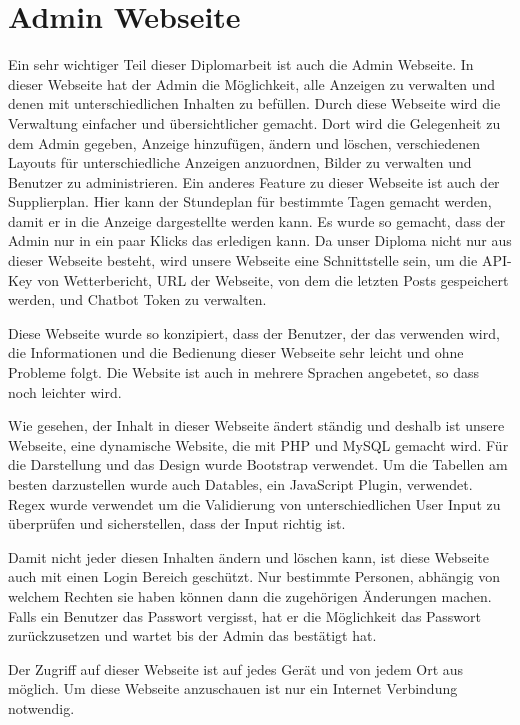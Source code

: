 \section{Admin Webseite}
Ein sehr wichtiger Teil dieser Diplomarbeit ist auch die Admin Webseite. In dieser Webseite hat der Admin die M\"{o}glichkeit, alle Anzeigen zu verwalten und denen mit unterschiedlichen Inhalten zu bef\"{u}llen. Durch diese Webseite wird die Verwaltung einfacher und \"{u}bersichtlicher gemacht. Dort wird die Gelegenheit zu dem Admin gegeben, Anzeige hinzuf\"{u}gen, \"{a}ndern und l\"{o}schen, verschiedenen Layouts f\"{u}r unterschiedliche Anzeigen anzuordnen, Bilder zu verwalten und Benutzer zu administrieren. Ein anderes Feature zu dieser Webseite ist auch der Supplierplan. Hier kann der Stundeplan f\"{u}r bestimmte Tagen gemacht werden, damit er in die Anzeige dargestellte werden kann. Es wurde so gemacht, dass der Admin nur in ein paar Klicks das erledigen kann. Da unser Diploma nicht nur aus dieser Webseite besteht, wird unsere Webseite eine Schnittstelle sein, um die API-Key von Wetterbericht, URL der Webseite, von dem die letzten Posts gespeichert werden, und Chatbot Token zu verwalten.

Diese Webseite wurde so konzipiert, dass der Benutzer, der das verwenden wird, die Informationen und die Bedienung dieser Webseite sehr leicht und ohne Probleme folgt. Die Website ist auch in mehrere Sprachen angebetet, so dass noch leichter wird.

Wie gesehen, der Inhalt in dieser Webseite \"{a}ndert st\"{a}ndig und deshalb ist unsere Webseite, eine dynamische Website, die mit PHP und MySQL gemacht wird. F\"{u}r die Darstellung und das Design wurde Bootstrap verwendet. Um die Tabellen am besten darzustellen wurde auch Datables, ein JavaScript Plugin, verwendet. Regex wurde verwendet um die Validierung von unterschiedlichen User Input zu \"{u}berpr\"{u}fen und sicherstellen, dass der Input richtig ist.


Damit nicht jeder diesen Inhalten \"{a}ndern und l\"{o}schen kann, ist diese Webseite auch mit einen Login Bereich gesch\"{u}tzt. Nur bestimmte Personen, abh\"{a}ngig von welchem Rechten sie haben k\"{o}nnen dann die zugeh\"{o}rigen \"{A}nderungen machen. Falls ein Benutzer das Passwort vergisst, hat er die M\"{o}glichkeit das Passwort zur\"{u}ckzusetzen und wartet bis der Admin das best\"{a}tigt hat.


Der Zugriff auf dieser Webseite ist auf jedes Ger\"{a}t und von jedem Ort aus m\"{o}glich. Um diese Webseite anzuschauen ist nur ein Internet Verbindung notwendig.


